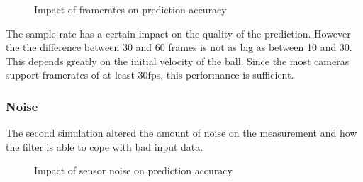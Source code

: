 \documentclass[titlepage, a4paper, 11pt]{scrartcl}
\begin{document}
\begin{figure}[H]
    \centering
    \caption{Impact of framerates on prediction accuracy}
    \label{fig:framerate10}
\end{figure}

The sample rate has a certain impact on the quality of the prediction. However the the difference between 30 and 60 frames is not as big as between 10 and 30. 
This depends greatly on the initial velocity of the ball. Since the most cameras support framerates of at least 30fps, this performance is sufficient.

\subsubsection{Noise}

The second simulation altered the amount of noise on the measurement and how the filter is able to cope with bad input data.

\begin{figure}[H]
    \centering
    \caption{Impact of sensor noise on prediction accuracy}
    \label{fig:noise2}
\end{figure}
\end{document}
